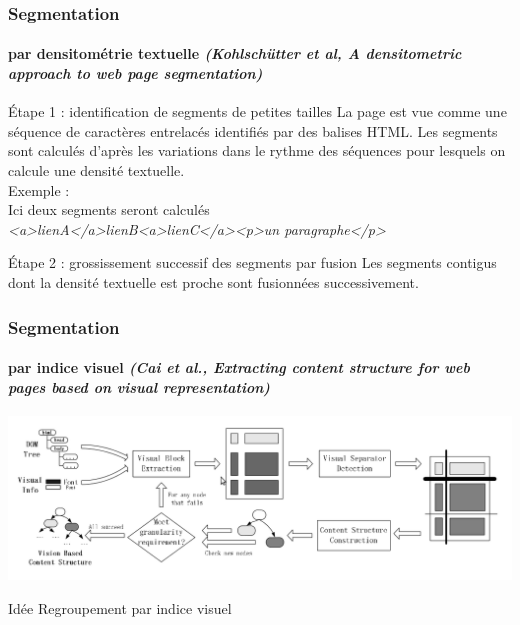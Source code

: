 \documentclass[9pt]{beamer}
\begin{document}
\begin{frame}
\frametitle{Segmentation}
\framesubtitle{par densitométrie textuelle \textit{(Kohlsch{\"u}tter et al, A densitometric approach to web page segmentation)}}

\begin{block}{Étape 1 : identification de segments de petites tailles}	
La page est vue comme une séquence de caractères entrelacés identifiés par des balises HTML. Les segments sont calculés d'après les variations dans le rythme des séquences pour lesquels on calcule une densité textuelle.\\
Exemple : \\
Ici deux segments seront calculés \\
\textit{<a>lienA</a>lienB<a>lienC</a><p>un paragraphe</p>}
\end{block}

\begin{block}{Étape 2 : grossissement successif des segments par fusion}
Les segments contigus dont la densité textuelle est proche sont fusionnées successivement.
\end{block}

\end{frame}

\begin{frame}
\frametitle{Segmentation}
\framesubtitle{par indice visuel \textit{(Cai et al., Extracting content structure for web pages based on visual representation)}}
\includegraphics[scale=0.3]{img/segmentation-vips.png}
\begin{block}{Idée}
Regroupement par indice visuel
\end{block}
\end{frame}
\end{document}
